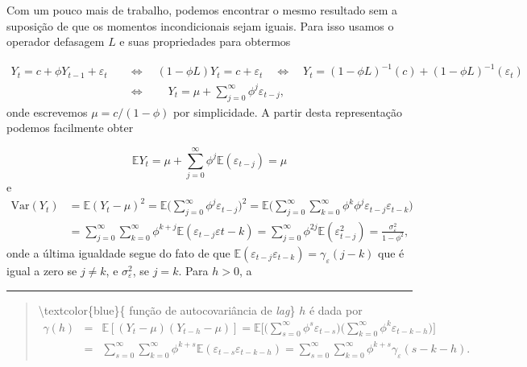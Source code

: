 \documentclass[
]{book}
\theoremstyle{definition}
\theoremstyle{definition}
\theoremstyle{definition}
\theoremstyle{remark}
\begin{document}
Com um pouco mais de trabalho, podemos encontrar o mesmo resultado sem a suposição de que os momentos incondicionais sejam iguais. Para isso usamos o operador defasagem \(L\) e suas propriedades para obtermos

\begin{align}
   Y_t = c + \phi Y_{t-1}+\varepsilon_t \quad &\Longleftrightarrow\quad (1-\phi L)Y_t=c+\varepsilon_t\quad \Longleftrightarrow\quad Y_t=(1-\phi L)^{-1}(c)+{(1-\phi L)}^{-1}(\varepsilon_t)\nonumber\\
\qquad &\Longleftrightarrow\qquad Y_t=\mu+\sum_{j=0}^{\infty}\phi^j\varepsilon_{t-j},
\label{eq:arcomomainfinito}
\end{align}
onde escrevemos \(\mu=c/(1-\phi)\) por simplicidade. A partir desta representação podemos facilmente obter

\begin{equation*}
\mathbb{E}  Y_t=\mu+\sum_{j=0}^{\infty}\phi^j\mathbb{E}(\varepsilon_{t-j})=\mu
\end{equation*}
e
\begin{align*}
\mbox{Var}(Y_t)&=\mathbb{E}(Y_t-\mu)^2=\mathbb{E}\bigg(\sum_{j=0}^{\infty}\phi^j\varepsilon_{t-j}\bigg)^2=\mathbb{E}\bigg(\sum_{j=0}^\infty\sum_{k=0}^\infty \phi^k\phi^j\varepsilon_{t-j}\varepsilon_{t-k}\bigg)\\
&=\sum_{j=0}^\infty\sum_{k=0}^\infty \phi^{k+j}\mathbb{E}(\varepsilon_{t-j}\varepsilon{t-k})=\sum_{j=0}^{\infty}\phi^{2j}\mathbb{E}(\varepsilon_{t-j}^2)=\frac{\sigma^2_\varepsilon}{1-\phi^2},
\end{align*}
onde a última igualdade segue do fato de que \(\mathbb{E}(\varepsilon_{t-j}\varepsilon_{t-k})=\gamma_\varepsilon(j-k)\) que é igual a zero se \(j\neq k\), e \(\sigma^2_\varepsilon\), se \(j=k\). Para \(h>0\), a

\begin{center}\rule{0.5\linewidth}{0.5pt}\end{center}

\begin{quote}
\textbackslash textcolor\{blue\}\{ função de autocovariância de \emph{lag}\} \(h\) é dada por
\begin{eqnarray*}
\gamma(h)&=&\mathbb{E}[(Y_t-\mu)(Y_{t-h}-\mu)]=\mathbb{E}\bigg[\bigg(\sum_{s=0}^{\infty}\phi^s\varepsilon_{t-s}\bigg)
\bigg(\sum_{k=0}^{\infty}\phi^k\varepsilon_{t-k-h}\bigg)\bigg]\\
&=&\sum_{s=0}^{\infty}\sum_{k=0}^{\infty}\phi^{k+s}\mathbb{E}(\varepsilon_{t-s}\varepsilon_{t-k-h})=\sum_{s=0}^{\infty}\sum_{k=0}^{\infty}\phi^{k+s}\gamma_\varepsilon(s-k-h).
\end{eqnarray*}
\end{quote}
\end{document}
